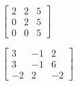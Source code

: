 \begin{oppgave}
%
%
%
%
%
%
%
%
%


\begin{punkt}
$
\begin{bmatrix}
2 & 2 & 5\\
0 & 2 & 5\\
0 & 0 & 5
\end{bmatrix}
$ 
\end{punkt}
%
%
%
%
%
%
%
%
%
%
\begin{punkt}
$\begin{bmatrix}
3 & -1 & 2\\
3 & -1 & 6\\
-2 & 2 & -2
\end{bmatrix}$
\end{punkt}


\end{oppgave}

